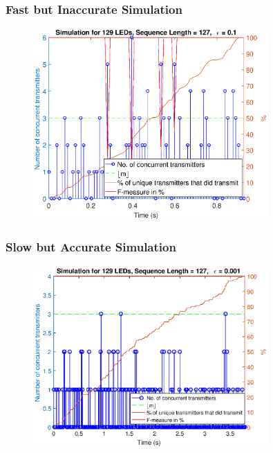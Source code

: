 \documentclass{beamer}
\begin{document}

	\begin{frame}\frametitle{Fast but Inaccurate Simulation}
		
		\begin{figure}
			\centering
			\includegraphics[width=0.8\textwidth]{../chapters/evaluation-chapters/simulation/sim-concurrent-tx-and-f-measure-eps=1-n=7}
		\end{figure}

	\end{frame}





	\begin{frame}\frametitle{Slow but Accurate Simulation}
		
		\begin{figure}
			\centering
			\includegraphics[width=0.8\textwidth]{../chapters/evaluation-chapters/simulation/sim-concurrent-tx-and-f-measure-eps=001-n=7}
		\end{figure}

	\end{frame}
\end{document}
